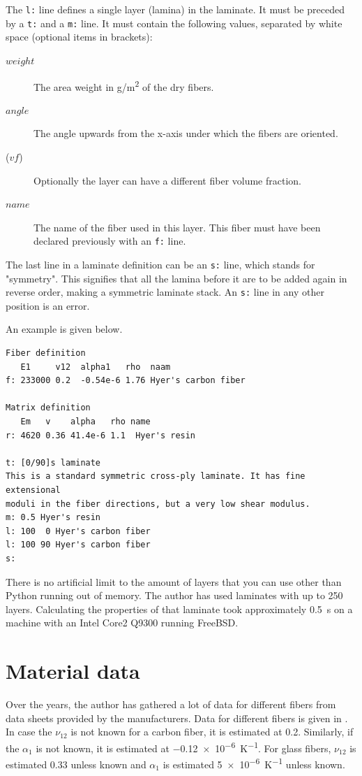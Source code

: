 \documentclass[a4paper,landscape,oneside,11pt,twocolumn]{memoir}
\begin{document}
The \texttt{l:} line defines a single layer (lamina) in the laminate. It must be
preceded by a \texttt{t:} and a \texttt{m:} line. It must contain the following values,
separated by white space (optional items in brackets):
\begin{description}
    \item[$weight$] The area weight in \si{g/m^2} of the dry fibers.
    \item[$angle$] The angle upwards from the x-axis under which the fibers are oriented.
    \item[($vf$)] Optionally the layer can have a different fiber volume fraction.
    \item[$name$] The name of the fiber used in this layer. This fiber must have been
        declared previously with an \texttt{f:} line.
\end{description}

The last line in a laminate definition can be an \texttt{s:} line, which stands
for "symmetry". This signifies that all the lamina before it are to be added
again in reverse order, making a symmetric laminate stack. An \texttt{s:} line in any
other position is an error.

An example is given below.
\begin{lstlisting}[style=plain]
Fiber definition
   E1     v12  alpha1   rho  naam
f: 233000 0.2  -0.54e-6 1.76 Hyer's carbon fiber

Matrix definition
   Em   v    alpha   rho name
r: 4620 0.36 41.4e-6 1.1  Hyer's resin

t: [0/90]s laminate
This is a standard symmetric cross-ply laminate. It has fine extensional
moduli in the fiber directions, but a very low shear modulus.
m: 0.5 Hyer's resin
l: 100  0 Hyer's carbon fiber
l: 100 90 Hyer's carbon fiber
s:
\end{lstlisting}

There is no artificial limit to the amount of layers that you can use other
than Python running out of memory. The author has used laminates with up to
250 layers. Calculating the properties of that laminate took approximately
\SI{0.5}{s} on a machine with an Intel Core2 Q9300 running FreeBSD.

\section{Material data} %

Over the years, the author has gathered a lot of data for different fibers
from data sheets provided by the manufacturers. Data for different
fibers is given in . In case the $\nu_{12}$ is not
known for a carbon fiber, it is estimated at 0.2. Similarly, if the
$\alpha_1$ is not known, it is estimated at \SI{-0.12e-6}{K^{-1}}. For glass
fibers, $\nu_{12}$ is estimated 0.33 unless known and $\alpha_1$ is estimated
\SI{5e-6}{K^{-1}} unless known.
\end{document}
